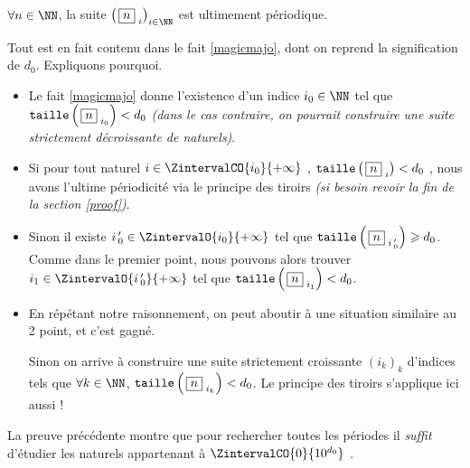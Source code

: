 \medskip

\begin{fact}\label{beautifulproof}
	$\forall n \in \NN$, la suite $\left( \, \sqseq{n}{i} \right)_{i \in \NN}$ est ultimement périodique.
\end{fact}

\begin{proof*}
	Tout est en fait contenu dans le fait \ref{magicmajo}, dont on reprend la signification de $d_0$. Expliquons pourquoi.
	\begin{itemize}[label = \textbullet]
		\item Le fait \ref{magicmajo} donne l'existence d'un indice $i_0 \in \NN$ tel que $\operatorname{\text{\normalfont\texttt{taille}}}\left( \, \fbox{$n$}_{\,\,i_0} \right) < d_0$ \emph{(dans le cas contraire, on pourrait construire une suite strictement décroissante de naturels)}.

		\item Si pour tout naturel $i \in \ZintervalCO{i_0}{+\infty}$ , $\operatorname{\text{\normalfont\texttt{taille}}}\left( \, \fbox{$n$}_{\,\,i} \right) < d_0$ , nous avons l'ultime périodicité via le principe des tiroirs \emph{(si besoin revoir la fin de la section \ref{proof})}.

		\item Sinon il existe $i\,^\prime_0 \in \ZintervalO{i_0}{+\infty}$ tel que $\operatorname{\text{\normalfont\texttt{taille}}}\left( \, \fbox{$n$}_{\,\,i\,^\prime_0} \right) \geqslant d_0$. Comme dans le premier point, nous pouvons alors trouver $i_1 \in \ZintervalO{i\,^\prime_0}{+\infty}$ tel que $\operatorname{\text{\normalfont\texttt{taille}}}\left( \, \fbox{$n$}_{\,\,i_1} \right) < d_0$.
		
		\item En répétant notre raisonnement,
		on peut aboutir à une situation similaire au 2\ieme{} point, et c'est gagné. 
		
		\noindent
		Sinon on arrive à construire une suite strictement croissante $\left( i_k \right)_k$ d'indices tels que $\forall k \in \NN$, $\operatorname{\text{\normalfont\texttt{taille}}}\left( \, \fbox{$n$}_{\,\,i_k} \right) < d_0$. Le principe des tiroirs s'applique ici aussi !
	\end{itemize}
\end{proof*}



\medskip

\begin{remark}
	La preuve précédente montre que pour rechercher toutes les périodes il \emph{\og suffit \fg} d'étudier les naturels appartenant à $\ZintervalCO{0}{10^{d_0}}$ .
\end{remark}
